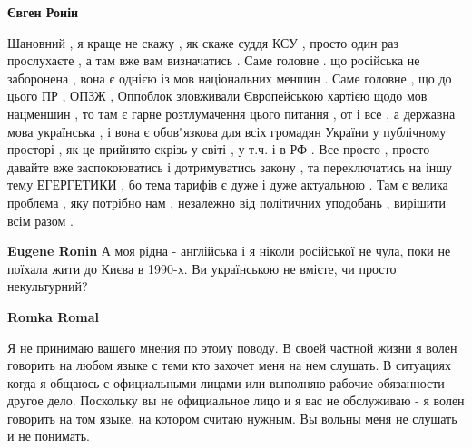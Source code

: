\begin{itemize}
\begin{itemize}
 
\textbf{Євген Ронін} 

Шановний , я краще не скажу , як скаже суддя КСУ , просто один раз прослухаєте
, а там вже вам визначатись . Саме головне . що російська не заборонена , вона
є однією із мов національних меншин . Саме головне , що до цього ПР , ОПЗЖ ,
Оппоблок зловживали Європейською хартією щодо мов нацменшин , то там є гарне
розтлумачення цього питання , от і все , а державна мова українська , і вона є
обов"язкова для всіх громадян України у публічному просторі , як це прийнято
скрізь у світі , у т.ч. і в РФ . Все просто , просто давайте вже заспокоюватись
і дотримуватись закону , та переключатись на іншу тему ЕГЕРГЕТИКИ , бо тема
тарифів є дуже і дуже актуальною . Там є велика проблема , яку потрібно нам ,
незалежно від політичних уподобань , вирішити всім разом .

 
\textbf{Eugene Ronin} А моя рідна - англійська і я ніколи російської не чула,
поки не поїхала жити до Києва в 1990-х. Ви українською не вмієте, чи просто
некультурний?

 
\textbf{Romka Romal} 

Я не принимаю вашего мнения по этому поводу. В своей частной жизни я волен
говорить на любом языке с теми кто захочет меня на нем слушать. В ситуациях
когда я общаюсь с официальными лицами или выполняю рабочие обязанности - другое
дело. Поскольку вы не официальное лицо и я вас не обслуживаю - я волен говорить
на том языке, на котором считаю нужным. Вы вольны меня не слушать и не
понимать.

 

\end{itemize}
\end{itemize}
